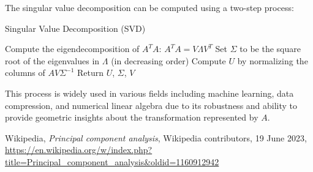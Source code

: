\documentclass{tufte-handout}
\begin{document}
The singular value decomposition can be computed using a two-step process:

\begin{algorithm}
\caption{Singular Value Decomposition (SVD)}
\begin{algorithmic}[1]
\State Compute the eigendecomposition of $A^{T}A$: $A^{T}A = V \Lambda V^{T}$
\State Set $\Sigma$ to be the square root of the eigenvalues in $\Lambda$ (in decreasing order)
\State Compute $U$ by normalizing the columns of $AV\Sigma^{-1}$
\State Return $U$, $\Sigma$, $V$
\EndProcedure
\end{algorithmic}
\end{algorithm}

This process is widely used in various fields including machine learning, data compression, and numerical linear algebra due to its robustness and ability to provide geometric insights about the transformation represented by $A$.



\begin{thebibliography}{9}

  Wikipedia,
  \textit{Principal component analysis},
  Wikipedia contributors, 
  19 June 2023,
  \url{https://en.wikipedia.org/w/index.php?title=Principal_component_analysis&oldid=1160912942}

\end{thebibliography}
\end{document}
